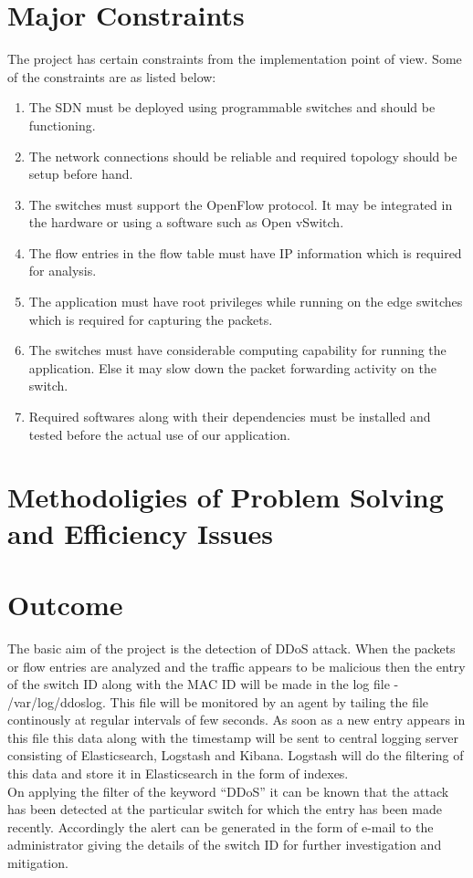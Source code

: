 \documentclass[12pt,a4paper,final]{report}
\begin{document}
\section{Major Constraints}
The project has certain constraints from the implementation point of view. Some of the constraints are as listed below:

\begin{enumerate}
\item
The SDN must be deployed using programmable switches and should be functioning.

\item
The network connections should be reliable and required topology should be setup before hand.

\item
The switches must support the OpenFlow protocol. It may be integrated in the hardware or using a software such as Open vSwitch.

\item 
The flow entries in the flow table must have IP information which is required for analysis.

\item
The application must have root privileges while running on the edge switches which is required for capturing the packets.

\item
The switches must have considerable computing capability for running the application. Else it may slow down the packet forwarding activity on the switch.

\item
Required softwares along with their dependencies must be installed and tested before the actual use of our application.
\end{enumerate}

\section{Methodoligies of Problem Solving and Efficiency Issues}

\section{Outcome}
The basic aim of the project is the detection of DDoS attack. When the packets or flow entries are analyzed and the traffic appears to be malicious then the entry of the switch ID along with the MAC  ID will be made in the log file - /var/log/ddoslog. This file will be monitored by an agent by tailing the file continously at regular intervals of few seconds. As soon as a new entry appears in this file this data along with the timestamp will be sent to central logging server consisting of Elasticsearch, Logstash and Kibana. Logstash will do the filtering of this data and store it in Elasticsearch in the form of indexes. \\
On applying the filter of the keyword “DDoS” it can be known that the attack has been detected at the particular switch for which the entry has been made recently. Accordingly the alert can be generated in the form of e-mail to the administrator giving the details of the switch ID for further investigation and mitigation.
\end{document}
